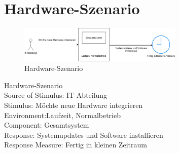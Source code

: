 \section{Hardware-Szenario}
\begin{figure}[tbh]
  \centering
  \includegraphics[width=0.7\textwidth]{Graphics/Hardware.png}
  \caption{Hardware-Szenario}
  \label{fig:Qualitaet6}
\end{figure}


Hardware-Szenario\\
Source of Stimulus: IT-Abteilung\\
Stimulus: Möchte neue Hardware integrieren\\
Environment:Laufzeit, Normalbetrieb\\
Component: Gesamtsystem\\
Response: Systemupdates und Software installieren\\
Response Measure: Fertig in kleinen Zeitraum\\

